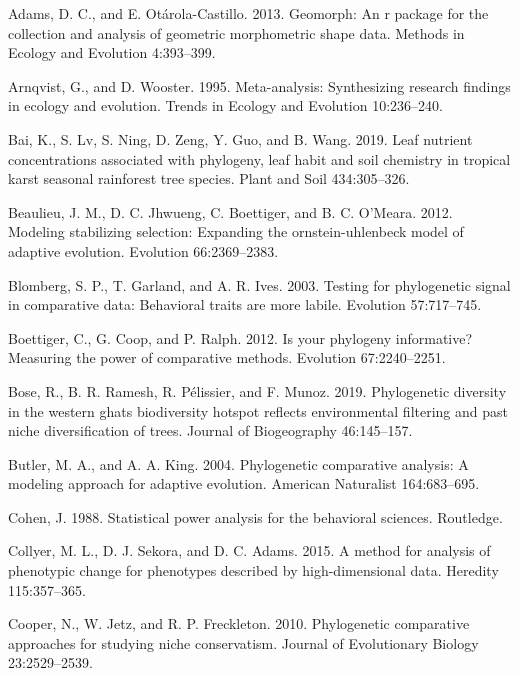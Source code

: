 \documentclass[
]{article}
\begin{document}
\leavevmode\hypertarget{ref-AdamsOtarola2013}{}%
Adams, D. C., and E. Otárola-Castillo. 2013. Geomorph: An r package for
the collection and analysis of geometric morphometric shape data.
Methods in Ecology and Evolution 4:393--399.

\leavevmode\hypertarget{ref-Arnqvist1995}{}%
Arnqvist, G., and D. Wooster. 1995. Meta-analysis: Synthesizing research
findings in ecology and evolution. Trends in Ecology and Evolution
10:236--240.

\leavevmode\hypertarget{ref-Bai2019}{}%
Bai, K., S. Lv, S. Ning, D. Zeng, Y. Guo, and B. Wang. 2019. Leaf
nutrient concentrations associated with phylogeny, leaf habit and soil
chemistry in tropical karst seasonal rainforest tree species. Plant and
Soil 434:305--326.

\leavevmode\hypertarget{ref-Beaulieu_et_al2012}{}%
Beaulieu, J. M., D. C. Jhwueng, C. Boettiger, and B. C. O'Meara. 2012.
Modeling stabilizing selection: Expanding the ornstein-uhlenbeck model
of adaptive evolution. Evolution 66:2369--2383.

\leavevmode\hypertarget{ref-Blomberg_et_al2003}{}%
Blomberg, S. P., T. Garland, and A. R. Ives. 2003. Testing for
phylogenetic signal in comparative data: Behavioral traits are more
labile. Evolution 57:717--745.

\leavevmode\hypertarget{ref-Boettiger_et_al2012}{}%
Boettiger, C., G. Coop, and P. Ralph. 2012. Is your phylogeny
informative? Measuring the power of comparative methods. Evolution
67:2240--2251.

\leavevmode\hypertarget{ref-Bose2019}{}%
Bose, R., B. R. Ramesh, R. Pélissier, and F. Munoz. 2019. Phylogenetic
diversity in the western ghats biodiversity hotspot reflects
environmental filtering and past niche diversification of trees. Journal
of Biogeography 46:145--157.

\leavevmode\hypertarget{ref-ButlerKing2004}{}%
Butler, M. A., and A. A. King. 2004. Phylogenetic comparative analysis:
A modeling approach for adaptive evolution. American Naturalist
164:683--695.

\leavevmode\hypertarget{ref-Cohen1988}{}%
Cohen, J. 1988. Statistical power analysis for the behavioral sciences.
Routledge.

\leavevmode\hypertarget{ref-Collyer_et_al2015a}{}%
Collyer, M. L., D. J. Sekora, and D. C. Adams. 2015. A method for
analysis of phenotypic change for phenotypes described by
high-dimensional data. Heredity 115:357--365.

\leavevmode\hypertarget{ref-Cooper2010}{}%
Cooper, N., W. Jetz, and R. P. Freckleton. 2010. Phylogenetic
comparative approaches for studying niche conservatism. Journal of
Evolutionary Biology 23:2529--2539.
\end{document}
